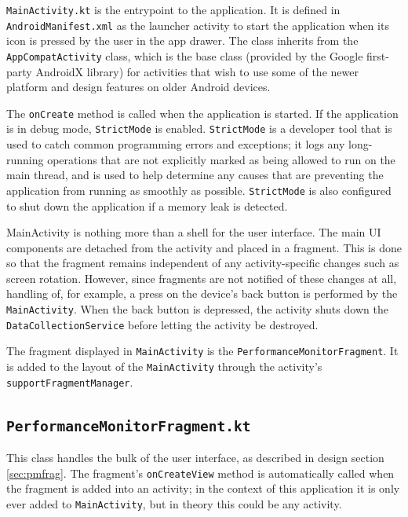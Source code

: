 \documentclass[11pt,twoside,a4paper]{report}
\begin{document}
\texttt{MainActivity.kt} is the entrypoint to the application. It is defined in \texttt{AndroidManifest.xml} as the launcher activity to start the application when its icon is pressed by the user in the app drawer. The class inherits from the \texttt{AppCompatActivity} class, which is the base class (provided by the Google first-party AndroidX library) for activities that wish to use some of the newer platform and design features on older Android devices.

The \texttt{onCreate} method is called when the application is started. If the application is in debug mode, \texttt{StrictMode} is enabled. \texttt{StrictMode} is a developer tool that is used to catch common programming errors and exceptions; it logs any long-running operations that are not explicitly marked as being allowed to run on the main thread, and is used to help determine any causes that are preventing the application from running as smoothly as possible. \texttt{StrictMode} is also configured to shut down the application if a memory leak is detected.

MainActivity is nothing more than a shell for the user interface. The main UI components are detached from the activity and placed in a fragment. This is done so that the fragment remains independent of any activity-specific changes such as screen rotation. However, since fragments are not notified of these changes at all, handling of, for example, a press on the device's back button is performed by the \texttt{MainActivity}. When the back button is depressed, the activity shuts down the \texttt{DataCollectionService} before letting the activity be destroyed.

The fragment displayed in \texttt{MainActivity} is the \texttt{PerformanceMonitorFragment}. It is added to the layout of the \texttt{MainActivity} through the activity's \texttt{supportFragmentManager}.

\subsection{\texttt{PerformanceMonitorFragment.kt}}

This class handles the bulk of the user interface, as described in design section \ref{sec:pmfrag}. The fragment's \texttt{onCreateView} method is automatically called when the fragment is added into an activity; in the context of this application it is only ever added to \texttt{MainActivity}, but in theory this could be any activity.
\end{document}
